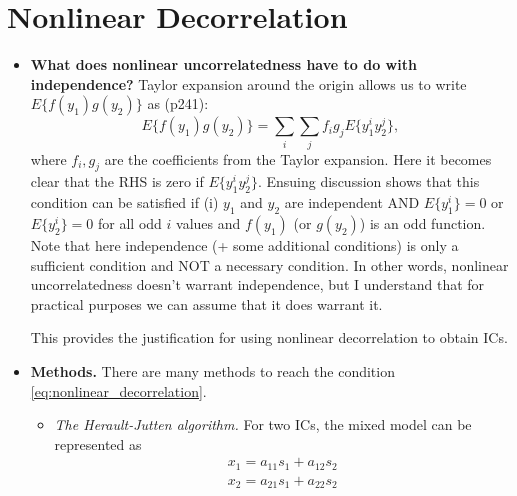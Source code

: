 \documentclass[a4paper, one	side]{book}
\begin{document}
\section{Nonlinear Decorrelation}

\begin{itemize}
\item \textbf{What does nonlinear uncorrelatedness have to do with independence?} Taylor expansion around the origin allows us to write $E\{f(y_1)g(y_2)\}$ as (p241):
$$ E\{f(y_1)g(y_2)\} = \sum_i\sum_j f_i g_j E\{y_1^i y_2^j\}, $$
where $f_i,g_j$ are the coefficients from the Taylor expansion. Here it becomes clear that the RHS is zero if $E\{y_1^i y_2^j\}$. Ensuing discussion shows that this condition can be satisfied if (i) $y_1$ and $y_2$ are independent AND $E\{y_1^i\}=0$ or $E\{y_2^i\}=0$ for all odd $i$ values and $f(y_1)$ (or $g(y_2)$) is an odd function. Note that here independence (+ some additional conditions) is only a sufficient condition and NOT a necessary condition. In other words, nonlinear uncorrelatedness doesn't warrant independence, but I understand that for practical purposes we can assume that it does warrant it. 

This provides the justification for using nonlinear decorrelation to obtain ICs.

\item \textbf{Methods.} There are many methods to reach the condition \eqref{eq:nonlinear_decorrelation}. 
	\begin{itemize}
	\item \textit{The Herault-Jutten algorithm.} For two ICs, the mixed model can be represented as
	\begin{align*}
	x_1 = a_{11}s_1 + a_{12} s_2 \\
	x_2 = a_{21}s_1 + a_{22} s_2
	\end{align*}
	

\end{itemize}
\end{itemize}
\end{document}

